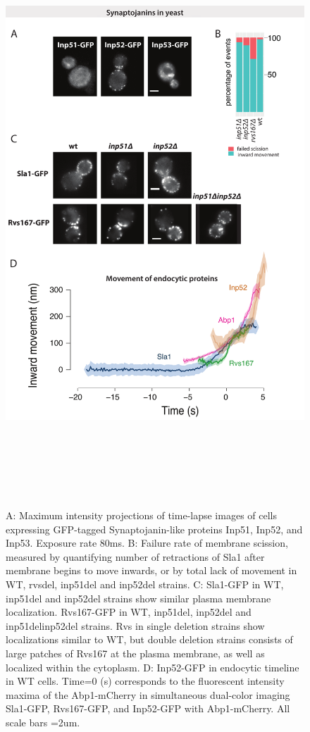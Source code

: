 		\begin{figure}
		\centering
		\includegraphics[width=22cm,height=22cm,keepaspectratio]{figures/results_final/inp}
		\caption[Syanptojanin-like proteins in yeast]
		{A: Maximum intensity projections of time-lapse images of cells expressing GFP-tagged Synaptojanin-like proteins Inp51, Inp52, and Inp53. Exposure rate 80ms.
		B: Failure rate of membrane scission, measured by quantifying number of retractions of Sla1 after membrane begins to move inwards, or by total lack of movement in WT, rvsdel, inp51del and inp52del strains.
		C: Sla1-GFP in WT, inp51del and inp52del strains show similar plasma membrane localization. Rvs167-GFP in WT, inp51del, inp52del and inp51delinp52del strains. Rvs in single deletion strains show localizations similar to WT, but double deletion strains consists of large patches of Rvs167 at the plasma membrane, as well as localized within the cytoplasm. 
		D: Inp52-GFP in endocytic timeline in WT cells. Time=0 (s) corresponds to the fluorescent intensity maxima of the Abp1-mCherry in simultaneous dual-color imaging Sla1-GFP, Rvs167-GFP, and Inp52-GFP with Abp1-mCherry. 
		All scale bars =2um.
		\label{fig_inp}}
		\end{figure}
		

